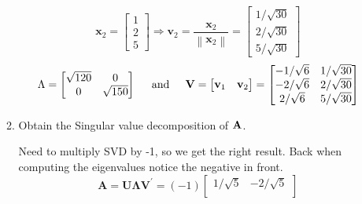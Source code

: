 \begin{enumerate}[font=\bfseries]
\begin{enumerate}
            \[
                \mathbf{x}_2
                =
                \begin{bmatrix}
                    1 \\
                    2 \\
                    5
                \end{bmatrix}
                \Rightarrow
                \mathbf{v}_2
                =
                \frac{\mathbf{x}_2}{\left\|\mathbf{x}_2\right\|}
                =
                \begin{bmatrix}
                    1/\sqrt{30} \\
                    2/\sqrt{30} \\
                    5/\sqrt{30}
                \end{bmatrix}
            \]
            \[
                \Lambda
                =
                \begin{bmatrix}
                    \sqrt{120} & 0 \\
                    0 & \sqrt{150}
                \end{bmatrix}
                \hspace{0.2in}\text{and}\hspace{0.2in}
                \mathbf{V}
                =
                \begin{bmatrix}
                    \mathbf{v}_1 & \mathbf{v}_2
                \end{bmatrix}
                =
                \begin{bmatrix}
                    -1/\sqrt{6} & 1/\sqrt{30} \\
                    -2/\sqrt{6} & 2/\sqrt{30} \\
                    2/\sqrt{6} & 5/\sqrt{30}
                \end{bmatrix}
            \]
            \item Obtain the Singular value decomposition of $\bold{A}$.
            \newline
            \par
            Need to multiply SVD by -1, so we get the right result. Back when computing the eigenvalues notice the negative in front.
            \[
                \mathbf{A}
                =
                \mathbf{U}\mathbf{\Lambda}\mathbf{\mathbf{V}}^\prime
                =
                (-1)
                \begin{bmatrix}
                    1/\sqrt{5} & -2/\sqrt{5} \\

\end{bmatrix}\]
\end{enumerate}
\end{enumerate}
